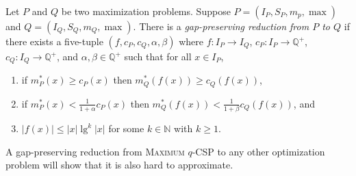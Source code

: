 \documentclass[]{article}
\begin{document}
\begin{definition}
  Let $P$ and $Q$ be two maximization problems. Suppose $P = (I_P, S_P, m_p, \max)$ and $Q = (I_Q, S_Q, m_Q, \max)$.
  There is a \emph{gap-preserving reduction from $P$ to $Q$} if there exists a five-tuple $(f, c_P, c_Q, \alpha, \beta)$ where $f \colon I_P \to I_Q$, $c_P \colon I_P \to \mathbb{Q}^+$, $c_Q \colon I_Q \to \mathbb{Q}^+$, and $\alpha, \beta \in \mathbb{Q}^+$ such that for all $x \in I_P$,
  \begin{enumerate}
  \item if $m^*_P(x) \geq c_P(x)$ then $m^*_Q(f(x)) \geq c_Q(f(x))$,
  \item if $m^*_P(x) < \frac{1}{1 + \alpha} c_P(x)$ then $m^*_Q(f(x)) < \frac{1}{1 + \beta} c_Q(f(x))$, and
  \item $|f(x)| \leq |x| \lg^k |x|$ for some $k \in \mathbb{N}$ with $k \geq 1$.
  \end{enumerate}
\end{definition}

A gap-preserving reduction from \textsc{Maximum $q$-CSP} to any other optimization problem will show that it is also hard to approximate.



\end{document}
